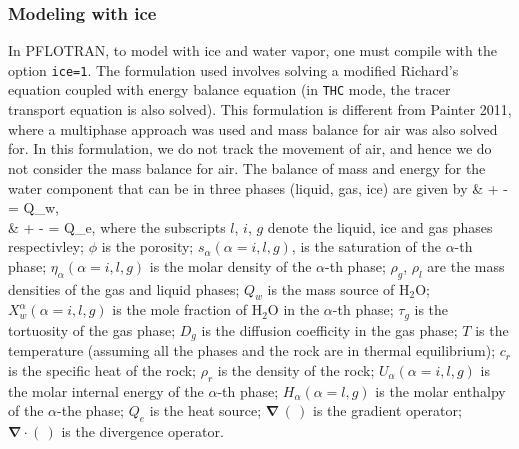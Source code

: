 \subsubsection{Modeling with ice}
In PFLOTRAN, to model with ice and water vapor, one must compile with the option \texttt{ice=1}. The formulation used involves solving a modified Richard's equation coupled with energy balance equation (in \texttt{THC} mode, the tracer transport equation is also solved). This formulation is different from Painter 2011, where a multiphase approach was used and mass balance for air was also solved for. In this formulation, we do not track the movement of air, and hence we do not consider the mass balance for air. The balance of mass and energy for the water component that can be in three phases (liquid, gas, ice) are given by
\SEQ
\BA
&  + \boldsymbol{\nabla} \cdot {} - \boldsymbol{\nabla} \cdot {} = Q_w, \\
&  + \boldsymbol{\nabla} \cdot {} - \boldsymbol{\nabla} \cdot {} = Q_e,
\EA \label{eq:balance_eqns}
\SEN where the subscripts $l$, $i$, $g$ denote the liquid, ice and gas phases respectivley; $\phi$ is the porosity; $s_{\alpha}  (\alpha = i, l, g)$, is the saturation of the $\alpha$-th phase; $\eta_{\alpha} (\alpha = i, l, g)$ is the molar density of the $\alpha$-th phase; $\rho_g$, $\rho_l$ are the mass densities of the gas and liquid phases; $Q_w$ is the mass source of H$_2$O;  $X_w^{\alpha} (\alpha = i, l, g)$ is the mole fraction of H$_2$O in the $\alpha$-th phase;   $\tau_g$ is the tortuosity of the gas phase; $D_g$ is the diffusion coefficity in the gas phase;  $T$ is the temperature (assuming all the phases and the rock are in thermal equilibrium); $c_r$ is the specific heat of the rock; $\rho_r$ is the density of the rock; $U_{\alpha} (\alpha = i, l, g)$ is the molar internal energy of the $\alpha$-th phase; $H_{\alpha} (\alpha = l, g)$ is the molar enthalpy of the $\alpha$-the phase; $Q_e$ is the heat source; $\boldsymbol{\nabla}\, (\, )$ is the gradient operator; $\boldsymbol{\nabla}\cdot (\,)$ is the divergence operator. 

